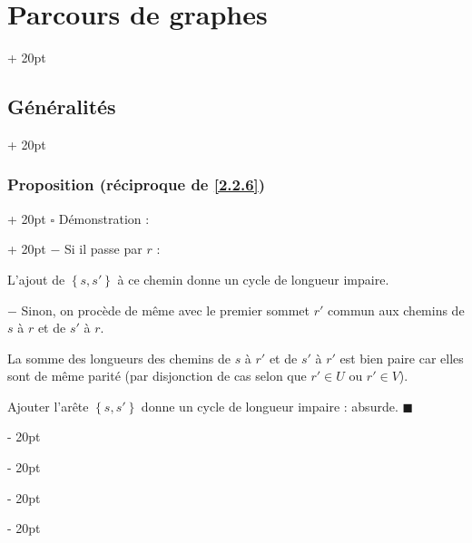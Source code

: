 \documentclass[a4paper, 12pt, twoside]{article}
\newcommand{\set}[1]{\left\{ #1 \right\}}
\newcommand{\ind}[1][20pt]{\advance\leftskip + #1}
\newcommand{\deind}[1][20pt]{\advance\leftskip - #1}
\newenvironment{indt}[2][20pt]{#2 \par \ind[#1]}{\par \deind} %
\begin{document}
\begin{indt}{\section{Parcours de graphes}}
\begin{indt}{\subsection{Généralités}}
\begin{indt}{\subsubsection{Proposition (réciproque de \ref{2.2.6})}}
\begin{indt}{$\square$ Démonstration :}
                    $-$ Si il passe par $r$ :

                    \begin{center}
                    \end{center}

                    L'ajout de $\set{s, s'}$ à ce chemin donne un cycle de longueur impaire.

                    $-$ Sinon, on procède de même avec le premier sommet $r'$ commun aux chemins de $s$ à $r$ et de $s'$ à $r$.

                    La somme des longueurs des chemins de $s$ à $r'$ et de $s'$ à $r'$ est bien paire car elles sont de même parité (par disjonction de cas selon que $r' \in U$ ou $r' \in V$).

                    Ajouter l'arête $\set{s, s'}$ donne un cycle de longueur impaire : absurde. $\blacksquare$
                \end{indt}
            \end{indt}

            \vspace{12pt}
            

\end{indt}
\end{indt}
\end{document}
